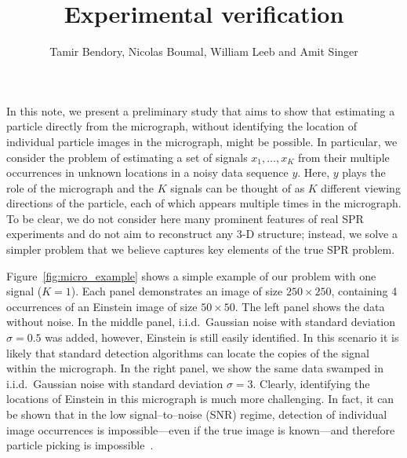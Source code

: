 \documentclass[english,11pt]{article}
\theoremstyle{plain}
\theoremstyle{definition}
\theoremstyle{remark}
\theoremstyle{plain}
\newcommand{\SNR}{{\textsf{SNR}}}
\begin{document}
\title{Experimental verification}


\author{Tamir Bendory, Nicolas Boumal, William Leeb and Amit Singer}
\maketitle

In this note, we present a preliminary study that aims to show that estimating a particle 
directly from the micrograph, without identifying the location of individual particle images in the micrograph, might be possible. 
In particular, we consider the problem of estimating a set of signals $x_1,\ldots,x_K$ from their multiple occurrences in unknown  locations in a noisy data sequence $y$. Here, $y$ plays the role of the micrograph and the $K$ signals can be thought of as $K$ different viewing directions of the particle, each of which  appears multiple times in the micrograph. 
To be clear, we do not consider here many prominent features of real SPR experiments and do not aim to reconstruct any 3-D structure; instead, we solve a simpler problem that we believe captures key elements of the true SPR problem. 

Figure~\ref{fig:micro_example} shows a simple example of our problem with  one signal ($K=1$). 
Each panel demonstrates an image of size $250\times 250$, containing 4 occurrences of an Einstein image of size $50\times 50$. 
The left panel shows the data without noise. In the middle panel,  i.i.d.\ Gaussian noise with standard deviation $\sigma=0.5$  was added, however,  Einstein is still easily identified. In this scenario it is likely that standard detection algorithms can locate the copies of the signal within the micrograph. In the right panel, we show the same data swamped in  
i.i.d.\ Gaussian noise with standard deviation  $\sigma=3$.
Clearly, identifying the locations of Einstein in this micrograph is much more challenging. In fact, it can be shown that in the low signal--to--noise (\SNR) regime, 
detection  of individual image occurrences is impossible---even if the true image is known---and therefore particle picking is impossible~\cite{aguerrebere2016fundamental}. 
 
\end{document}
